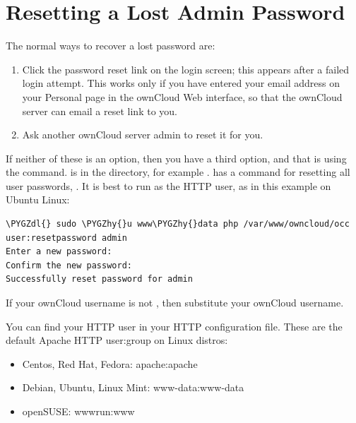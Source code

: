 \documentclass[letterpaper,10pt,english]{sphinxmanual}
\def\PYGZdl{\char`\$}
\def\PYGZhy{\char`\-}
\begin{document}
\section{Resetting a Lost Admin Password}
\label{configuration_user/reset_admin_password::doc}\label{configuration_user/reset_admin_password:resetting-a-lost-admin-password}
The normal ways to recover a lost password are:
\begin{enumerate}
\item {} 
Click the password reset link on the login screen; this appears after a
failed login attempt. This works only if you have entered your email address
on your Personal page in the ownCloud Web interface, so that the ownCloud
server can email a reset link to you.

\item {} 
Ask another ownCloud server admin to reset it for you.

\end{enumerate}

If neither of these is an option, then you have a third option, and that is
using the  command.  is in the  directory, for
example .  has a command for resetting all
user passwords, . It is best to run  as the HTTP
user, as in this example on Ubuntu Linux:

\begin{Verbatim}[commandchars=\\\{\}]
\PYGZdl{} sudo \PYGZhy{}u www\PYGZhy{}data php /var/www/owncloud/occ user:resetpassword admin
Enter a new password:
Confirm the new password:
Successfully reset password for admin
\end{Verbatim}

If your ownCloud username is not , then substitute your ownCloud
username.

You can find your HTTP user in your HTTP configuration file. These are the
default Apache HTTP user:group on Linux distros:
\begin{itemize}
\item {} 
Centos, Red Hat, Fedora: apache:apache

\item {} 
Debian, Ubuntu, Linux Mint: www-data:www-data

\item {} 
openSUSE: wwwrun:www

\end{itemize}
\end{document}
